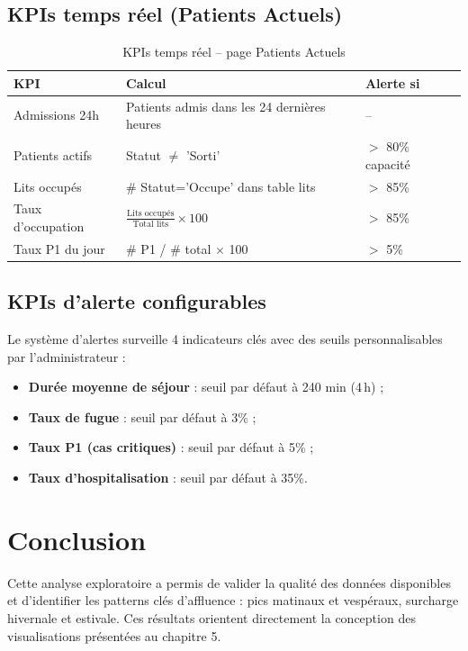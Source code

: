 \documentclass[12pt,a4paper]{report}
\begin{document}
	\subsection{KPIs temps réel (Patients Actuels)}
	
	\begin{table}[H]
		\centering
		\caption{KPIs temps réel -- page Patients Actuels}
		\renewcommand{\arraystretch}{1.2}
		\begin{tabular}{lll}
			\toprule
			\textbf{KPI} & \textbf{Calcul} & \textbf{Alerte si} \\
			\midrule
			Admissions 24h    & Patients admis dans les 24 dernières heures  & -- \\
			Patients actifs   & Statut $\neq$ 'Sorti' & $>$ 80\% capacité \\
			Lits occupés      & \# Statut='Occupe' dans table lits & $>$ 85\% \\
			Taux d'occupation & $\frac{\text{Lits occupés}}{\text{Total lits}} \times 100$ & $>$ 85\% \\
			Taux P1 du jour   & \# P1 / \# total $\times$ 100 & $>$ 5\% \\
			\bottomrule
		\end{tabular}
	\end{table}
	\newpage
	\subsection{KPIs d'alerte configurables}
	
	Le système d'alertes surveille 4 indicateurs clés avec des seuils personnalisables
	par l'administrateur :
	
	\begin{itemize}
		\item \textbf{Durée moyenne de séjour} : seuil par défaut à 240 min (4\,h) ;
		\item \textbf{Taux de fugue} : seuil par défaut à 3\% ;
		\item \textbf{Taux P1 (cas critiques)} : seuil par défaut à 5\% ;
		\item \textbf{Taux d'hospitalisation} : seuil par défaut à 35\%.
	\end{itemize}
	
	\section{Conclusion}
	
	Cette analyse exploratoire a permis de valider la qualité des données disponibles et
	d'identifier les patterns clés d'affluence : pics matinaux et vespéraux, surcharge
	hivernale et estivale. Ces résultats orientent directement la conception des visualisations
	présentées au chapitre 5.
	
\end{document}

